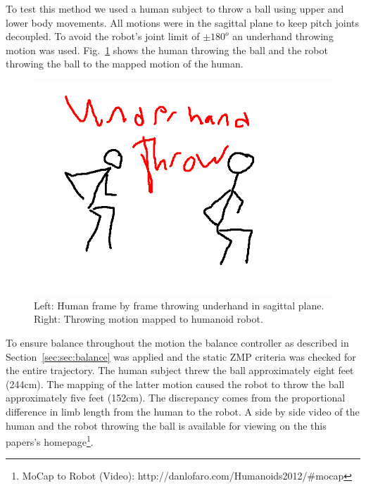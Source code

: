 To test this method we used a human subject to throw a ball using upper and lower body movements.  
All motions were in the sagittal plane to keep pitch joints decoupled.  
To avoid the robot's joint limit of $\pm180^o$ an underhand throwing motion was used.
Fig.~\ref{fig:mocap-underhand} shows the human throwing the ball and the robot throwing the ball to the mapped motion of the human.

\begin{figure}[t]
  \centering
\includegraphics[width=1.0\columnwidth]{./pix/mocap-Underhand-throw.png}
  \caption{Left: Human frame by frame throwing underhand in sagittal plane.  Right: Throwing motion mapped to humanoid robot.}
  \label{fig:mocap-underhand}
\end{figure}

To ensure balance throughout the motion the balance controller as described in Section~\ref{sec:sec:balance} was applied and the static ZMP criteria was checked for the entire trajectory.
The human subject threw the ball approximately eight feet (244cm).  
The mapping of the latter motion caused the robot to throw the ball approximately five feet (152cm).
The discrepancy comes from the proportional difference in limb length from the human to the robot.
A side by side video of the human and the robot throwing the ball is available for viewing on the this papers's homepage\footnote{MoCap to Robot (Video): http://danlofaro.com/Humanoids2012/\#mocap}.




